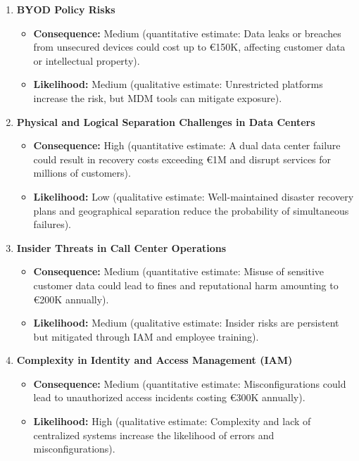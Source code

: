 \begin{enumerate}
    \item \textbf{BYOD Policy Risks}
    \begin{itemize}
        \item \textbf{Consequence:} Medium (quantitative estimate: Data leaks or breaches from unsecured devices could cost up to €150K, affecting customer data or intellectual property).
        \item \textbf{Likelihood:} Medium (qualitative estimate: Unrestricted platforms increase the risk, but MDM tools can mitigate exposure).
    \end{itemize}

    \item \textbf{Physical and Logical Separation Challenges in Data Centers}
    \begin{itemize}
        \item \textbf{Consequence:} High (quantitative estimate: A dual data center failure could result in recovery costs exceeding €1M and disrupt services for millions of customers).
        \item \textbf{Likelihood:} Low (qualitative estimate: Well-maintained disaster recovery plans and geographical separation reduce the probability of simultaneous failures).
    \end{itemize}

    \item \textbf{Insider Threats in Call Center Operations}
    \begin{itemize}
        \item \textbf{Consequence:} Medium (quantitative estimate: Misuse of sensitive customer data could lead to fines and reputational harm amounting to €200K annually).
        \item \textbf{Likelihood:} Medium (qualitative estimate: Insider risks are persistent but mitigated through IAM and employee training).
    \end{itemize}

    \item \textbf{Complexity in Identity and Access Management (IAM)}
    \begin{itemize}
        \item \textbf{Consequence:} Medium (quantitative estimate: Misconfigurations could lead to unauthorized access incidents costing €300K annually).
        \item \textbf{Likelihood:} High (qualitative estimate: Complexity and lack of centralized systems increase the likelihood of errors and misconfigurations).
    \end{itemize}


\end{enumerate}
